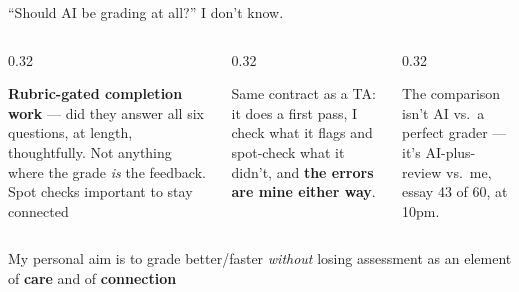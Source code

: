 \documentclass[aspectratio=169, 10pt]{beamer}
\begin{document}
\begin{frame}{``Should AI be grading at all?''}
\vskip-2pt
I don't know.
\vskip3pt
\begin{columns}[T]
\begin{column}{0.32\textwidth}
\begin{tcolorbox}[keybox, title={1. Very happy with mechanical roles}, top=2pt, bottom=2pt]
\footnotesize \textbf{Rubric-gated completion work} --- did they answer all six questions, at length, thoughtfully. Not anything where the grade \emph{is} the feedback. Spot checks important to stay connected
\end{tcolorbox}
\end{column}
\begin{column}{0.32\textwidth}
\begin{tcolorbox}[keybox, title={2. Can be helpful as a robot TA}, top=2pt, bottom=2pt]
\footnotesize Same contract as a TA: it does a first pass, I check what it flags and spot-check what it didn't, and \textbf{the errors are mine either way}.
\end{tcolorbox}
\end{column}
\begin{column}{0.32\textwidth}
\begin{tcolorbox}[keybox, title={3. When I need more consistency}, top=2pt, bottom=2pt]
\footnotesize  The comparison isn't AI vs.\ a perfect grader --- it's AI-plus-review vs.\ me, essay 43 of 60, at 10pm.
\end{tcolorbox}
\end{column}
\end{columns}
\vskip5pt
\begin{tcolorbox}[accentbox, top=3pt, bottom=3pt]
\small My personal aim is to grade better/faster \emph{without} losing assessment as an element of \textbf{care} and of \textbf{connection} 
\end{tcolorbox}
\end{frame}

\end{document}
